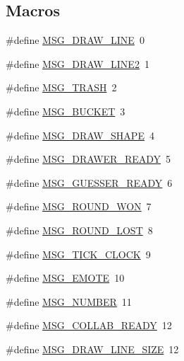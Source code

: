 \subsection*{Macros}
\begin{DoxyCompactItemize}
\item 
\#define \mbox{\hyperlink{group__uart__wordgame_ga174090df51169960d2e624bdaf3ed205}{M\+S\+G\+\_\+\+D\+R\+A\+W\+\_\+\+L\+I\+NE}}~0
\item 
\#define \mbox{\hyperlink{group__uart__wordgame_ga94de5f531719e708e566c72514b4bb62}{M\+S\+G\+\_\+\+D\+R\+A\+W\+\_\+\+L\+I\+N\+E2}}~1
\item 
\#define \mbox{\hyperlink{group__uart__wordgame_gab273d0cd876a9c6ed9dd437bfc4093f9}{M\+S\+G\+\_\+\+T\+R\+A\+SH}}~2
\item 
\#define \mbox{\hyperlink{group__uart__wordgame_ga230c3cd186dead8cdb8741fedcacae00}{M\+S\+G\+\_\+\+B\+U\+C\+K\+ET}}~3
\item 
\#define \mbox{\hyperlink{group__uart__wordgame_ga69533bd282a2706a6bc92762ef6ca1bf}{M\+S\+G\+\_\+\+D\+R\+A\+W\+\_\+\+S\+H\+A\+PE}}~4
\item 
\#define \mbox{\hyperlink{group__uart__wordgame_ga176f5b496627d57766cc07ca1c453ab7}{M\+S\+G\+\_\+\+D\+R\+A\+W\+E\+R\+\_\+\+R\+E\+A\+DY}}~5
\item 
\#define \mbox{\hyperlink{group__uart__wordgame_gacb356c2ba099c18f253bea8e6f5ddba6}{M\+S\+G\+\_\+\+G\+U\+E\+S\+S\+E\+R\+\_\+\+R\+E\+A\+DY}}~6
\item 
\#define \mbox{\hyperlink{group__uart__wordgame_gaaa90e694279612a628e231f0b0fd7599}{M\+S\+G\+\_\+\+R\+O\+U\+N\+D\+\_\+\+W\+ON}}~7
\item 
\#define \mbox{\hyperlink{group__uart__wordgame_ga60db4a8973d1eee22338702da2ffad8c}{M\+S\+G\+\_\+\+R\+O\+U\+N\+D\+\_\+\+L\+O\+ST}}~8
\item 
\#define \mbox{\hyperlink{group__uart__wordgame_gad84297ba02db2fda24408fb8c65d1564}{M\+S\+G\+\_\+\+T\+I\+C\+K\+\_\+\+C\+L\+O\+CK}}~9
\item 
\#define \mbox{\hyperlink{group__uart__wordgame_ga530579884286750350e61a9e88b2f488}{M\+S\+G\+\_\+\+E\+M\+O\+TE}}~10
\item 
\#define \mbox{\hyperlink{group__uart__wordgame_gac09fca7da2b45281b081222bb92bcf6e}{M\+S\+G\+\_\+\+N\+U\+M\+B\+ER}}~11
\item 
\#define \mbox{\hyperlink{group__uart__wordgame_gac19c0ecc61e60687dfd12a0be322d66f}{M\+S\+G\+\_\+\+C\+O\+L\+L\+A\+B\+\_\+\+R\+E\+A\+DY}}~12
\item 
\#define \mbox{\hyperlink{group__uart__wordgame_gacb1ba510b59373060c02982367ee4d5b}{M\+S\+G\+\_\+\+D\+R\+A\+W\+\_\+\+L\+I\+N\+E\+\_\+\+S\+I\+ZE}}~12

\end{DoxyCompactItemize}
